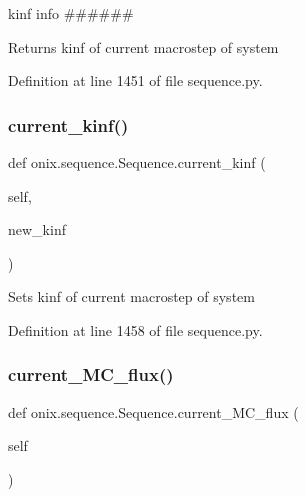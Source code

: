 kinf info \#\#\#\#\#\# 

\begin{DoxyVerb}Returns kinf of current macrostep of system\end{DoxyVerb}
 

Definition at line 1451 of file sequence.\+py.

\mbox{\label{classonix_1_1sequence_1_1Sequence_a5aa7ff064c123d8d1a7e2fc4cec77608}} 
\subsubsection{\texorpdfstring{current\+\_\+kinf()}{current\_kinf()}\hspace{0.1cm}{\footnotesize\ttfamily [2/2]}}
{\footnotesize\ttfamily def onix.\+sequence.\+Sequence.\+current\+\_\+kinf (\begin{DoxyParamCaption}\item[{}]{self,  }\item[{}]{new\+\_\+kinf }\end{DoxyParamCaption})}

\begin{DoxyVerb}Sets kinf of current macrostep of system\end{DoxyVerb}
 

Definition at line 1458 of file sequence.\+py.

\mbox{\label{classonix_1_1sequence_1_1Sequence_afddf2bf7212c5620af8955c5bff09033}} 
\subsubsection{\texorpdfstring{current\+\_\+\+M\+C\+\_\+flux()}{current\_MC\_flux()}\hspace{0.1cm}{\footnotesize\ttfamily [1/2]}}
{\footnotesize\ttfamily def onix.\+sequence.\+Sequence.\+current\+\_\+\+M\+C\+\_\+flux (\begin{DoxyParamCaption}\item[{}]{self }\end{DoxyParamCaption})}



